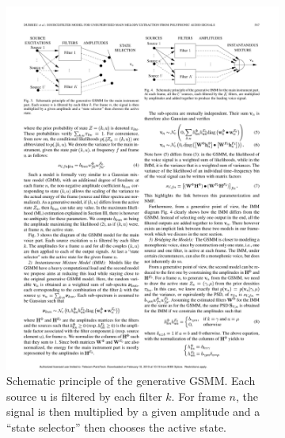 \begin{figure}
        \centering
        \begin{subfigure}[b]{0.47\textwidth}
                \includegraphics[width=\textwidth]{Figures/gsmm}
                \caption{Schematic principle of the generative GSMM. Each source u is filtered by each filter $k$. For frame $n$, the signal is then multiplied by a  given amplitude and a ``state selector'' then chooses the active state.}
                \label{fig:gsmm}
        \end{subfigure}%
        ~ %
        \begin{subfigure}[b]{0.47\textwidth}

\end{subfigure}
\end{figure}
